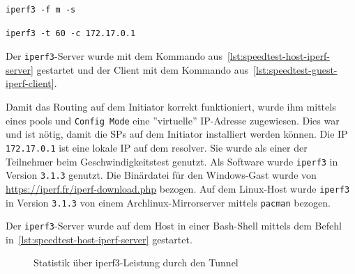 \begin{lstlisting}[label=lst:speedtest-host-iperf-server,caption=Kommando für den Start des iperf-Servers]
iperf3 -f m -s 
\end{lstlisting}

\begin{lstlisting}[label=lst:speedtest-guest-iperf-client,caption=Kommando für den Start des iperf-Clients]
iperf3 -t 60 -c 172.17.0.1
\end{lstlisting}
Der \texttt{iperf3}-Server wurde mit dem Kommando aus~\autoref{lst:speedtest-host-iperf-server}
gestartet und der Client mit dem Kommando aus~\autoref{lst:speedtest-guest-iperf-client}.


Damit das Routing auf dem Initiator korrekt funktioniert, wurde ihm mittels eines pools
und \texttt{Config Mode} eine ''virtuelle'' \ac{IP}-Adresse zugewiesen. Dies war und ist
nötig, damit die \acp{SP} auf dem Initiator installiert werden können.
Die IP \texttt{172.17.0.1} ist eine lokale IP auf dem resolver. Sie wurde als
einer der Teilnehmer beim Geschwindigkeitstest genutzt. 
Als Software wurde \texttt{iperf3} in Version \texttt{3.1.3} genutzt.
Die Binärdatei für den Windows-Gast wurde von \url{https://iperf.fr/iperf-download.php} bezogen.
Auf dem Linux-Host wurde \texttt{iperf3} in Version \texttt{3.1.3} von einem Archlinux-Mirrorserver mittels
\texttt{pacman} bezogen.

Der \texttt{iperf3}-Server wurde auf dem Host in einer Bash-Shell mittels
dem Befehl in~\autoref{lst:speedtest-host-iperf-server} gestartet.
\begin{figure}[h!]
\caption{Statistik über iperf3-Leistung durch den Tunnel}
\label{fig:iperf-statistics}
\end{figure}

